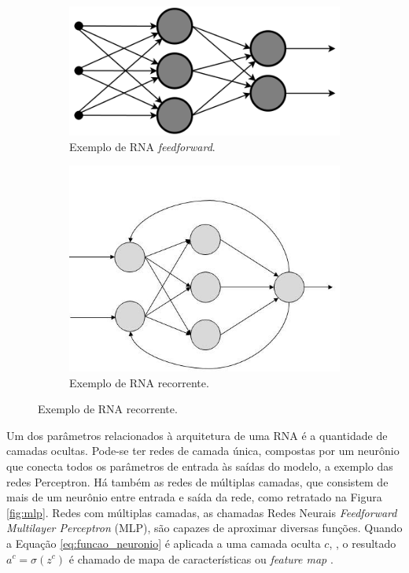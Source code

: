 \begin{figure}
	\caption{Exemplos de RNA com diferentes tipos de conexões entre neurônios.}
	\label{fig:rna_conectividade}
	\begin{subfigure}[h]{0.3\linewidth}
		\caption{Exemplo de RNA \emph{feedforward}.}
		\label{fig:feedforward}
		\includegraphics[width=\linewidth]{img/feedforward}
	\end{subfigure}
	\hfill
	\begin{subfigure}[h]{0.4\linewidth}
		\caption{Exemplo de RNA recorrente.}
		\label{fig:recorrente}
		\includegraphics[width=\linewidth]{img/recorrente}
	\end{subfigure}%
\end{figure}

Um dos parâmetros relacionados à arquitetura de uma RNA é a quantidade de camadas ocultas. Pode-se ter redes de camada única, compostas por um neurônio que conecta todos os parâmetros de entrada às saídas do modelo, a exemplo das redes Perceptron. Há também as redes de múltiplas camadas, que consistem de mais de um neurônio entre entrada e saída da rede, como retratado na Figura \ref{fig:mlp}. Redes com múltiplas camadas, as chamadas Redes Neurais \emph{Feedforward Multilayer Perceptron} (MLP), são capazes de aproximar diversas funções. Quando a Equação \ref{eq:funcao_neuronio} é aplicada a uma camada oculta $c$, , o resultado $a^{c} = \sigma(z^c)$ é chamado de mapa de características ou \emph{feature map} \cite{hornik1991approximation,Teresa:Livro}.

